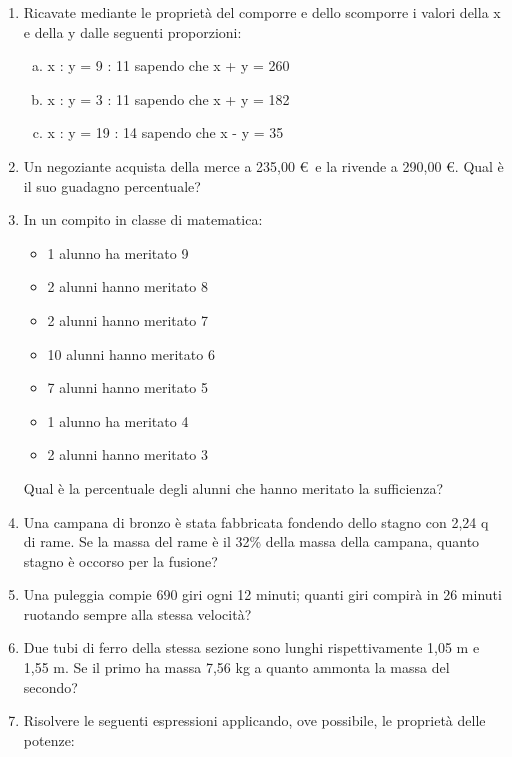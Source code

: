 \documentclass[]{article}
\newcommand*\result[1] {\hspace*{0em plus 1fill}{\footnotesize \makebox{[#1]}}}
\begin{document}
\begin{enumerate}
		
		\item Ricavate mediante le proprietà del comporre e dello scomporre i valori della x e della y dalle seguenti proporzioni:
		
		\begin{enumerate}[a.]
			\item x : y = 9 : 11 \quad sapendo che \quad x + y = 260
			\item x : y = 3 : 11 \quad sapendo che \quad x + y = 182
			\item x : y = 19 : 14 \quad sapendo che \quad x - y = 35
		\end{enumerate}
		
		\item Un negoziante acquista della merce a 235,00 \euro \, e la rivende a 290,00 \euro. Qual è il suo guadagno percentuale? \result{23,4\%}
		
		\item In un compito in classe di matematica:
		\begin{itemize}
		 	\item 1 alunno ha meritato 9
		 	\item 2 alunni hanno meritato 8
		 	\item 2 alunni hanno meritato 7
		 	\item 10 alunni hanno meritato 6
		 	\item 7 alunni hanno meritato 5
		 	\item 1 alunno ha meritato 4
		 	\item 2 alunni hanno meritato 3
		\end{itemize}
		
		Qual è la percentuale degli alunni che hanno meritato la sufficienza? \result{60\%}
		
		\item Una campana di bronzo è stata fabbricata fondendo dello stagno con 2,24 q di rame. Se la massa del rame è il 32\% della massa della campana, quanto stagno è occorso per la fusione? \result{4,76 q}
		
		\item Una puleggia compie 690 giri ogni 12 minuti; quanti giri compirà in 26 minuti ruotando sempre alla stessa velocità? \result{1495}
		
		\item Due tubi di ferro della stessa sezione sono lunghi rispettivamente 1,05 m e 1,55 m. Se il primo ha massa 7,56 kg a quanto ammonta la massa del secondo? \result{11,16 kg}
		
		\item Risolvere le seguenti espressioni applicando, ove possibile, le proprietà delle potenze:
		

\end{enumerate}
\end{document}
